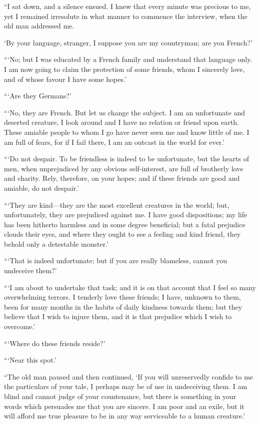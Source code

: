 \documentclass[12pt,openright]{book}
\begin{document}
“I sat down, and a silence ensued. I knew that every minute was precious to me, yet I remained irresolute in what manner to commence the interview, when the old man addressed me.

‘By your language, stranger, I suppose you are my countryman; are you French?’

“‘No; but I was educated by a French family and understand that language only. I am now going to claim the protection of some friends, whom I sincerely love, and of whose favour I have some hopes.’

“‘Are they Germans?’

“‘No, they are French. But let us change the subject. I am an unfortunate and deserted creature, I look around and I have no relation or friend upon earth. These amiable people to whom I go have never seen me and know little of me. I am full of fears, for if I fail there, I am an outcast in the world for ever.’

“‘Do not despair. To be friendless is indeed to be unfortunate, but the hearts of men, when unprejudiced by any obvious self-interest, are full of brotherly love and charity. Rely, therefore, on your hopes; and if these friends are good and amiable, do not despair.’

“‘They are kind—they are the most excellent creatures in the world; but, unfortunately, they are prejudiced against me. I have good dispositions; my life has been hitherto harmless and in some degree beneficial; but a fatal prejudice clouds their eyes, and where they ought to see a feeling and kind friend, they behold only a detestable monster.’

“‘That is indeed unfortunate; but if you are really blameless, cannot you undeceive them?’

“‘I am about to undertake that task; and it is on that account that I feel so many overwhelming terrors. I tenderly love these friends; I have, unknown to them, been for many months in the habits of daily kindness towards them; but they believe that I wish to injure them, and it is that prejudice which I wish to overcome.’

“‘Where do these friends reside?’

“‘Near this spot.’

“The old man paused and then continued, ‘If you will unreservedly confide to me the particulars of your tale, I perhaps may be of use in undeceiving them. I am blind and cannot judge of your countenance, but there is something in your words which persuades me that you are sincere. I am poor and an exile, but it will afford me true pleasure to be in any way serviceable to a human creature.’
\end{document}
